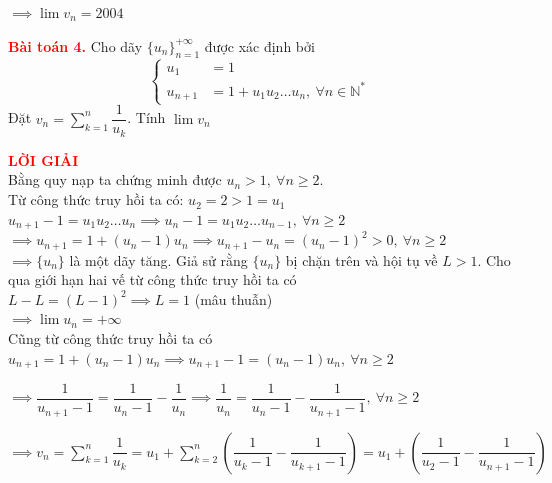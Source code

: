 \documentclass[a4paper, 12pt]{article}
\numberwithin{equation}{section}
\begin{document}
	$\implies \lim v_n = 2004$
    \newpage
    \begin{BoxRed}
	\textbf{\textcolor{red}{Bài toán 4.}}
		Cho dãy $\{ u_n \}_{n=1}^{+\infty}$ được xác định bởi
	\[ \left\{
	\begin{aligned}
		u_1 &= 1 \\
		u_{n+1} &= 1 + u_1 u_2\dots u_n, \ \forall n \in \mathbb{N}^*
	\end{aligned}
	\right. \]
	Đặt $v_n = \sum\limits_{k=1}^n \dfrac{1}{u_k}$. Tính $\lim v_n$
	\end{BoxRed}
	\textbf{\textcolor{red}{LỜI GIẢI}} \\
    Bằng quy nạp ta chứng minh được $u_n > 1, \ \forall n \geq 2$. \\ Từ công thức truy hồi ta có: $u_2 = 2 > 1 = u_1$\\
	$u_{n+1} - 1 = u_1u_2\dots u_n \implies u_n - 1 = u_1u_2\dots u_{n-1}, \ \forall n \geq 2$\\
	$\implies u_{n+1} = 1 + (u_n - 1)u_n \implies u_{n+1} - u_n = (u_n - 1)^2 > 0, \ \forall n \geq 2$\\
	$\implies \{u_n\}$ là một dãy tăng. Giả sử rằng $\{u_n\}$ bị chặn trên và hội tụ về $L > 1$. Cho qua giới hạn hai vế từ công thức truy hồi ta có \\
	$ L - L = (L - 1)^2 \implies L = 1$ (mâu thuẫn)\\
	$\implies \lim u_n = +\infty $\\
	Cũng từ công thức truy hồi ta có\\
    $u_{n+1} = 1 + (u_n - 1)u_n \implies u_{n+1} - 1 = (u_n - 1)u_n, \ \forall n \geq 2$

    $\implies \dfrac{1}{u_{n+1} - 1} = \dfrac{1}{u_n - 1} - \dfrac{1}{u_n} \implies \dfrac{1}{u_n} = \dfrac{1}{u_n - 1} - \dfrac{1}{u_{n+1} - 1}, \ \forall n \geq 2$

    $\implies v_n = \sum\limits_{k=1}^n \dfrac{1}{u_k} = u_1 + \sum\limits_{k=2}^n \left(\dfrac{1}{u_k - 1} - \dfrac{1}{u_{k+1} - 1} \right) = u_1 + \left(\dfrac{1}{u_2 - 1} - \dfrac{1}{u_{n+1} - 1} \right)$
\end{document}
